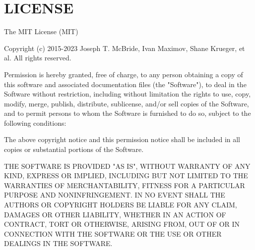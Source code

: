 \chapter{LICENSE}
\hypertarget{md__d_1_2_facultate_2an3_2_i_p_2_proiect_i_p_2_proiect___i_p_2packages_2_graph_q_l_8_analyzers_87_88_80_2_l_i_c_e_n_s_e}{}\label{md__d_1_2_facultate_2an3_2_i_p_2_proiect_i_p_2_proiect___i_p_2packages_2_graph_q_l_8_analyzers_87_88_80_2_l_i_c_e_n_s_e}
The MIT License (MIT)

Copyright (c) 2015-\/2023 Joseph T. Mc\+Bride, Ivan Maximov, Shane Krueger, et al. All rights reserved.

Permission is hereby granted, free of charge, to any person obtaining a copy of this software and associated documentation files (the "{}\+Software"{}), to deal in the Software without restriction, including without limitation the rights to use, copy, modify, merge, publish, distribute, sublicense, and/or sell copies of the Software, and to permit persons to whom the Software is furnished to do so, subject to the following conditions\+:

The above copyright notice and this permission notice shall be included in all copies or substantial portions of the Software.

THE SOFTWARE IS PROVIDED "{}\+AS IS"{}, WITHOUT WARRANTY OF ANY KIND, EXPRESS OR IMPLIED, INCLUDING BUT NOT LIMITED TO THE WARRANTIES OF MERCHANTABILITY, FITNESS FOR A PARTICULAR PURPOSE AND NONINFRINGEMENT. IN NO EVENT SHALL THE AUTHORS OR COPYRIGHT HOLDERS BE LIABLE FOR ANY CLAIM, DAMAGES OR OTHER LIABILITY, WHETHER IN AN ACTION OF CONTRACT, TORT OR OTHERWISE, ARISING FROM, OUT OF OR IN CONNECTION WITH THE SOFTWARE OR THE USE OR OTHER DEALINGS IN THE SOFTWARE. 